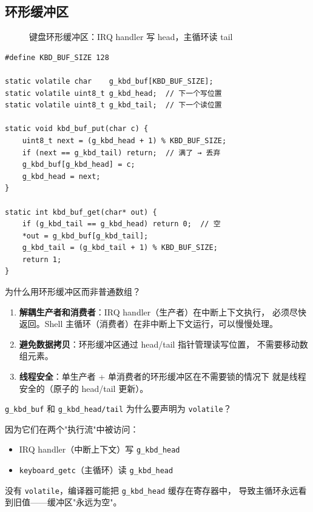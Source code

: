 \subsection{环形缓冲区}

\begin{figure}[H]
  \centering
  
  \caption{键盘环形缓冲区：IRQ handler 写 head，主循环读 tail}
\end{figure}

\begin{lstlisting}[style=cstyle]
#define KBD_BUF_SIZE 128

static volatile char    g_kbd_buf[KBD_BUF_SIZE];
static volatile uint8_t g_kbd_head;  // 下一个写位置
static volatile uint8_t g_kbd_tail;  // 下一个读位置

static void kbd_buf_put(char c) {
    uint8_t next = (g_kbd_head + 1) % KBD_BUF_SIZE;
    if (next == g_kbd_tail) return;  // 满了 → 丢弃
    g_kbd_buf[g_kbd_head] = c;
    g_kbd_head = next;
}

static int kbd_buf_get(char* out) {
    if (g_kbd_tail == g_kbd_head) return 0;  // 空
    *out = g_kbd_buf[g_kbd_tail];
    g_kbd_tail = (g_kbd_tail + 1) % KBD_BUF_SIZE;
    return 1;
}
\end{lstlisting}

\begin{designbox}
为什么用环形缓冲区而非普通数组？

\begin{enumerate}
  \item \textbf{解耦生产者和消费者}：IRQ handler（生产者）在中断上下文执行，
    必须尽快返回。Shell 主循环（消费者）在非中断上下文运行，可以慢慢处理。
  \item \textbf{避免数据拷贝}：环形缓冲区通过 head/tail 指针管理读写位置，
    不需要移动数组元素。
  \item \textbf{线程安全}：单生产者 + 单消费者的环形缓冲区在不需要锁的情况下
    就是线程安全的（原子的 head/tail 更新）。
\end{enumerate}
\end{designbox}

\begin{thinkbox}
\texttt{g\_kbd\_buf} 和 \texttt{g\_kbd\_head/tail} 为什么要声明为 \texttt{volatile}？

因为它们在两个"执行流"中被访问：
\begin{itemize}
  \item IRQ handler（中断上下文）写 \texttt{g\_kbd\_head}
  \item \texttt{keyboard\_getc}（主循环）读 \texttt{g\_kbd\_head}
\end{itemize}
没有 \texttt{volatile}，编译器可能把 \texttt{g\_kbd\_head} 缓存在寄存器中，
导致主循环永远看到旧值——缓冲区"永远为空"。
\end{thinkbox}

